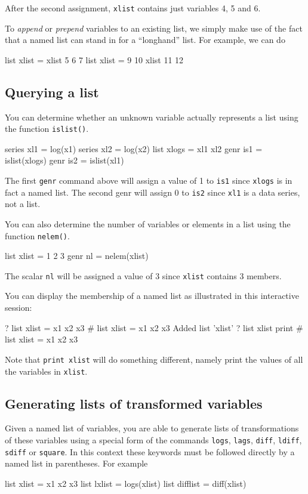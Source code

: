 After the second assignment, \texttt{xlist} contains just variables 4,
5 and 6.

To \textit{append} or \textit{prepend} variables to an existing list,
we simply make use of the fact that a named list can stand in for a
``longhand'' list.  For example, we can do
%
\begin{code}
list xlist = xlist 5 6 7
list xlist = 9 10 xlist 11 12
\end{code}

\subsection{Querying a list}

You can determine whether an unknown variable actually represents a list
using the function \texttt{islist()}.
%
\begin{code}
series xl1 = log(x1)
series xl2 = log(x2)
list xlogs = xl1 xl2
genr is1 = islist(xlogs)
genr is2 = islist(xl1)
\end{code}

The first \texttt{genr} command above will assign a value of 1 to
\texttt{is1} since \texttt{xlogs} is in fact a named list.  The second
genr will assign 0 to \texttt{is2} since \texttt{xl1} is a data
series, not a list.  

You can also determine the number of variables or elements in a list
using the function \texttt{nelem()}.
%
\begin{code}
list xlist = 1 2 3
genr nl = nelem(xlist)
\end{code}

The scalar \texttt{nl} will be assigned a value of 3 since
\texttt{xlist} contains 3 members.

You can display the membership of a named list as illustrated in this
interactive session:
%
\begin{code}
? list xlist = x1 x2 x3
 # list xlist = x1 x2 x3
Added list 'xlist'
? list xlist print
 # list xlist = x1 x2 x3
\end{code}
%
Note that \texttt{print xlist} will do something different, namely
print the values of all the variables in \texttt{xlist}.

\subsection{Generating lists of transformed variables}

Given a named list of variables, you are able to generate lists of
transformations of these variables using a special form of the
commands \texttt{logs}, \texttt{lags}, \texttt{diff}, \texttt{ldiff},
\texttt{sdiff} or \texttt{square}.  In this context these keywords
must be followed directly by a named list in parentheses.  For example
%
\begin{code}
list xlist = x1 x2 x3
list lxlist = logs(xlist)
list difflist = diff(xlist)
\end{code}

